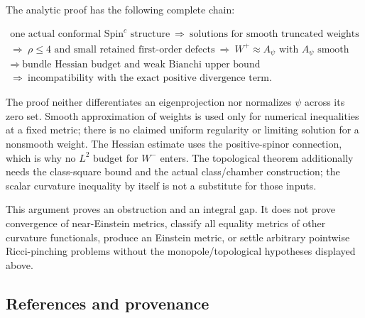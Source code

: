 \documentclass[
  11pt,
]{article}
\begin{document}
The analytic proof has the following complete chain:

\[
 \begin{gathered}
 \text{one actual conformal Spin}^c\text{ structure}
 \ \Longrightarrow\ \text{solutions for smooth truncated weights}\\
 \Longrightarrow\ \rho\le4\text{ and small retained first-order defects}
 \ \Longrightarrow\ W^+\approx A_\psi\text{ with }A_\psi\text{ smooth}\\
 \Longrightarrow\ \text{bundle Hessian budget and weak Bianchi upper bound}\\
 \Longrightarrow\ \text{incompatibility with the exact positive divergence term}.
 \end{gathered}
\]

The proof neither differentiates an eigenprojection nor normalizes
\(\psi\) across its zero set. Smooth approximation of weights is used
only for numerical inequalities at a fixed metric; there is no claimed
uniform regularity or limiting solution for a nonsmooth weight. The
Hessian estimate uses the positive-spinor connection, which is why no
\(L^2\) budget for \(W^-\) enters. The topological theorem additionally
needs the class-square bound and the actual class/chamber construction;
the scalar curvature inequality by itself is not a substitute for those
inputs.

This argument proves an obstruction and an integral gap. It does not
prove convergence of near-Einstein metrics, classify all equality
metrics of other curvature functionals, produce an Einstein metric, or
settle arbitrary pointwise Ricci-pinching problems without the
monopole/topological hypotheses displayed above.

\hypertarget{references-and-provenance}{%
\subsection{References and provenance}\label{references-and-provenance}}
\end{document}
